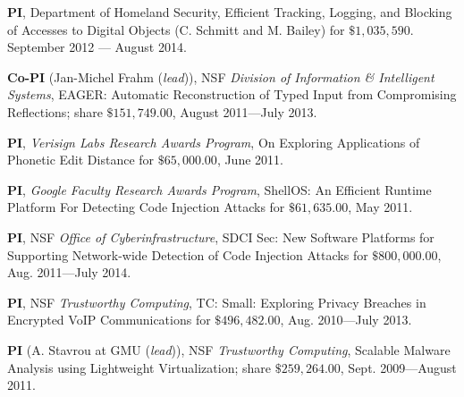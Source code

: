 \documentclass[11pt]{article}
\newcommand{\ignore}[1]{}
\newenvironment{cvhanglist}{%
  \begin{list}{}{%
    \setlength{\leftmargin}{1.8em}%
    \setlength{\itemindent}{-1.8em}%
    \setlength{\labelwidth}{0pt}%
    \setlength{\labelsep}{0pt}%
    \setlength{\itemsep}{0.35em}%
    \setlength{\parsep}{0pt}%
    \setlength{\topsep}{0.25em}%
  }%
}{\end{list}}
\begin{document}
\begin{cvhanglist}
\begin{cvhanglist}
{\item {\bf PI}, Department of Homeland Security, {\sc Efficient Tracking, Logging, and Blocking of Accesses to Digital Objects} (C. Schmitt and M. Bailey) for
 $\$1,035,590$. September 2012 --- August 2014.

 \item {\bf Co-PI} (Jan-Michel Frahm ({\it lead})), NSF {\it Division of Information \& Intelligent Systems}, {\sc EAGER: Automatic Reconstruction of Typed Input from Compromising Reflections}; share $\$151,749.00$,
August 2011---July 2013.

 \item {\bf PI}, {\it Verisign Labs Research Awards Program}, {\sc On Exploring Applications of Phonetic Edit Distance} for
 $\$65,000.00$, June 2011.

\item {\bf PI}, {\it Google Faculty Research Awards Program}, {\sc ShellOS: An Efficient Runtime Platform For Detecting Code Injection Attacks} for
 $\$61,635.00$, May 2011.

\item {\bf PI}, NSF {\it Office of Cyberinfrastructure}, {\sc SDCI Sec: New Software Platforms for Supporting Network-wide Detection of Code Injection Attacks}
 for $\$800,000.00$, Aug. 2011---July 2014. \hfill


\item {\bf PI}, NSF {\it Trustworthy Computing}, {\sc TC: Small:
 Exploring Privacy Breaches in Encrypted VoIP Communications} for $\$496,482.00$, Aug. 2010---July 2013. \hfill


\item {\bf PI} (A. Stavrou at GMU ({\it lead})), NSF {\it Trustworthy Computing}, {\sc  Scalable Malware Analysis using Lightweight
 Virtualization}; share $\$259,264.00$, Sept. 2009---August 2011. \hfill
}

\ignore{
\item {\bf PI}, {\sc Detecting and Monitoring
 Malfeasance on the Net}, Google Faculty Research Awards Program for
 $\$90,000.00$, March 2009--Feb 2010.

}
\end{cvhanglist}
\end{cvhanglist}
\end{document}
